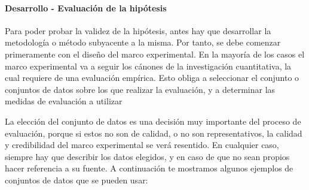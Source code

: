 \paragraph{Desarrollo - Evaluación de la hipótesis} Para poder probar la validez de la hipótesis, antes hay que desarrollar la metodología o método subyacente a la misma. Por tanto, se debe comenzar primeramente con el diseño del marco experimental. En la mayoría de los casos el marco experimental va a seguir los cánones de la investigación cuantitativa, la cual requiere de una evaluación empírica. Esto obliga a seleccionar el conjunto o conjuntos de datos sobre los que realizar la evaluación, y a determinar las medidas de evaluación a utilizar

La elección del conjunto de datos es una decisión muy importante del proceso de evaluación, porque si estos no son de calidad, o no son representativos, la calidad y credibilidad del marco experimental se verá resentido. En cualquier caso, siempre hay que describir los datos elegidos, y en caso de que no sean propios hacer referencia a su fuente. A continuación te mostramos algunos ejemplos de conjuntos de datos que se pueden usar:

